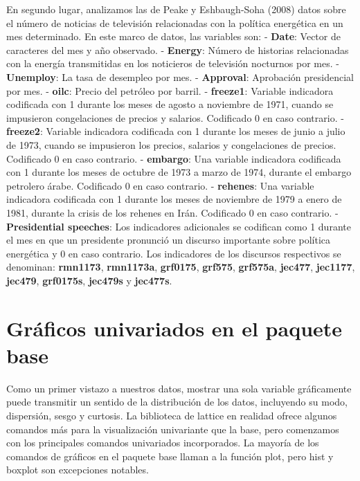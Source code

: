 \documentclass[
]{book}
\begin{document}
En segundo lugar, analizamos las de Peake y Eshbaugh-Soha (2008) datos sobre el número de noticias de televisión relacionadas con la política energética en un mes determinado. En este marco de datos, las variables son:
- \textbf{Date}: Vector de caracteres del mes y año observado.
- \textbf{Energy}: Número de historias relacionadas con la energía transmitidas en los noticieros de televisión nocturnos por mes.
- \textbf{Unemploy}: La tasa de desempleo por mes.
- \textbf{Approval}: Aprobación presidencial por mes.
- \textbf{oilc}: Precio del petróleo por barril.
- \textbf{freeze1}: Variable indicadora codificada con 1 durante los meses de agosto a noviembre de 1971, cuando se impusieron congelaciones de precios y salarios. Codificado 0 en caso contrario.
- \textbf{freeze2}: Variable indicadora codificada con 1 durante los meses de junio a julio de 1973, cuando se impusieron los precios, salarios y congelaciones de precios. Codificado 0 en caso contrario.
- \textbf{embargo}: Una variable indicadora codificada con 1 durante los meses de octubre de 1973 a marzo de 1974, durante el embargo petrolero árabe. Codificado 0 en caso contrario.
- \textbf{rehenes}: Una variable indicadora codificada con 1 durante los meses de noviembre de 1979 a enero de 1981, durante la crisis de los rehenes en Irán. Codificado 0 en caso contrario.
- \textbf{Presidential speeches}: Los indicadores adicionales se codifican como 1 durante el mes en que un presidente pronunció un discurso importante sobre política energética y 0 en caso contrario. Los indicadores de los discursos respectivos se denominan: \textbf{rmn1173}, \textbf{rmn1173a}, \textbf{grf0175}, \textbf{grf575}, \textbf{grf575a}, \textbf{jec477}, \textbf{jec1177}, \textbf{jec479}, \textbf{grf0175s}, \textbf{jec479s} y \textbf{jec477s}.

\hypertarget{gruxe1ficos-univariados-en-el-paquete-base}{%
\section*{Gráficos univariados en el paquete base}\label{gruxe1ficos-univariados-en-el-paquete-base}}

Como un primer vistazo a nuestros datos, mostrar una sola variable gráficamente puede transmitir un sentido de la distribución de los datos, incluyendo su modo, dispersión, sesgo y curtosis. La biblioteca de lattice en realidad ofrece algunos comandos más para la visualización univariante que la base, pero comenzamos con los principales comandos univariados incorporados. La mayoría de los comandos de gráficos en el paquete base llaman a la función plot, pero hist y boxplot son excepciones notables.
\end{document}
